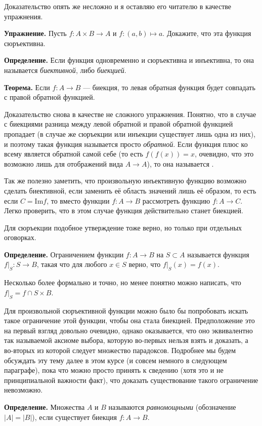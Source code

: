 Доказательство опять же несложно и я оставляю его читателю в качестве упражнения.

{\bfseries Упражнение.} Пусть $f:A \times B \to A$ и $f: (a, b)\mapsto a$. Докажите, что эта функция сюръективна.

{\bfseries Определение.} Если функция одновременно и сюръективна и инъективна, то она называется {\slshape биективной}, либо {\slshape биекцией}.

{\bfseries Теорема.} Если $f: A\to B$ — биекция, то левая обратная функция будет совпадать с правой обратной функцией.

Доказательство снова в качестве не сложного упражнения. Понятно, что в случае с биекциями разница между левой обратной и правой обратной функцией пропадает (в случае же сюръекции или инъекции существует лишь одна из них), и поэтому такая функция называется просто {\slshape обратной}. Если функция плюс ко всему является обратной самой себе (то есть $f(f(x)) = x$, очевидно, что это возможно лишь для отображений вида $A\to A$), то она называется .

Так же полезно заметить, что произвольную инъективную функцию возможно сделать биективной, если заменить её область значений лишь её образом, то есть если $C = \mathrm{Im} f$, то вместо функции $f: A\to B$ рассмотреть функцию $f: A \to C$. Легко проверить, что в этом случае функция действительно станет биекцией.

Для сюръекции подобное утверждение тоже верно, но только при отдельных оговорках.

{\bfseries Определение.} Ограничением функции $f: A\to B$ на $S\subset A$ называется функция $f|_S: S\to B$, такая что для любого $x\in S$ верно, что $f|_S(x) = f(x)$.

Несколько более формально и точно, но менее понятно можно написать, что $f|_S = f \cap S \times B$.

Для произвольной сюръективной функции можно было бы попробовать искать такое ограничение этой функции, чтобы она стала биекцией. Предположение это на первый взгляд довольно очевидно, однако оказывается, что оно эквивалентно так называемой аксиоме выбора, которую во-первых нельзя взять и доказать, а во-вторых из которой следует множество парадоксов. Подробнее мы будем обсуждать эту тему далее в этом курсе (и совсем немного в следующем параграфе), пока что можно просто принять к сведению (хотя это и не принципиальной важности факт), что доказать существование такого ограничение невозможно.

{\bfseries Определение.} Множества $A$ и $B$ называются {\slshape равномощными} (обозначение $|A| = |B|$), если существует биекция $f: A\to B$.

